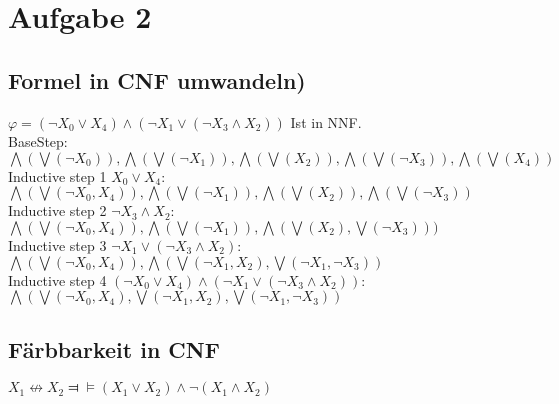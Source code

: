 \section*{Aufgabe 2}
\subsection*{Formel in CNF umwandeln)}

$\varphi = ( \neg X_0 \vee X_4 ) \wedge (\neg X_1 \vee (\neg X_3 \wedge X_2))$ Ist in NNF.\\

BaseStep:\\

$ \bigwedge ( \bigvee ( \neg X_0 ) ) , \bigwedge ( \bigvee (\neg X_1 ) ) , \bigwedge ( \bigvee (X_2 ) ) , \bigwedge ( \bigvee (\neg X_3 ) ) , \bigwedge ( \bigvee (X_4 ) )  $\\

Inductive step 1 $X_0 \vee X_4$:\\

$  \bigwedge ( \bigvee ( \neg X_0 , X_4 ) )  , \bigwedge ( \bigvee (\neg X_1 ) ) , \bigwedge ( \bigvee (X_2 ) ) , \bigwedge ( \bigvee (\neg X_3 ) )  $\\

Inductive step 2 $\neg X_3 \wedge X_2$:\\

$ \bigwedge ( \bigvee ( \neg X_0 , X_4 ) ) 
, \bigwedge ( \bigvee (\neg X_1 ) ) ,
 \bigwedge ( \bigvee (X_2 ),  \bigvee ( \neg X_3 )) ) 
 $\\

Inductive step 3 $ \neg X_1 \vee ( \neg X_3 \wedge X_2 )$:\\

$ \bigwedge ( \bigvee ( \neg X_0 , X_4 ) ) 
, \bigwedge ( \bigvee (\neg X_1, X_2  ) , \bigvee (\neg X_1, \neg X_3  ) ) 
 $\\

Inductive step 4 $ ( \neg X_0 \vee X_4 ) \wedge (\neg X_1 \vee (\neg X_3 \wedge X_2))$:\\

$ \bigwedge ( \bigvee ( \neg X_0 , X_4 ) , \bigvee (\neg X_1, X_2  ) , \bigvee (\neg X_1, \neg X_3  ) ) 
 $\\
 
 \subsection*{Färbbarkeit in CNF}
 
$X_1 \not \leftrightarrow X_2 \Dashv \vDash   (X_1 \vee X_2 ) \wedge \neg (X_1 \wedge X_2)$ \\

